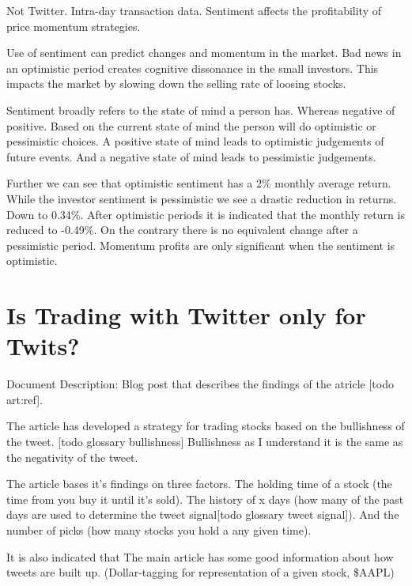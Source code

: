Not Twitter. Intra-day transaction data. 
Sentiment affects the profitability of price momentum strategies.

Use of sentiment can predict changes and momentum in the market.
Bad news in an optimistic period creates cognitive dissonance in the small
investors. This impacts the market by slowing down the selling rate of loosing
stocks. \cite[p29]{doukas10:sentiment_and_momentum} 

Sentiment broadly refers to the state of mind a person has. Whereas negative of
positive. Based on the current state of mind the person will do optimistic or
pessimistic choices. A positive state of mind leads to optimistic judgements of
future events. And a negative state of mind leads to pessimistic judgements. 
\cite[p4]{doukas10:sentiment_and_momentum} 

Further we can see that optimistic sentiment has a 2\% monthly average return. 
While the investor sentiment is pessimistic we see a drastic reduction in
returns. Down to 0.34\%.\cite[p5]{doukas10:sentiment_and_momentum} 
After optimistic periods it is indicated that the monthly return is reduced to
-0.49\%. On the contrary there is no equivalent change after a pessimistic
period. \cite[p6-7]{doukas10:sentiment_and_momentum} 
Momentum profits are only significant when the sentiment is optimistic.
\cite[p29]{doukas10:sentiment_and_momentum}


\section{Is Trading with Twitter only for Twits?}\label{art:ITTT}
Document Description: Blog post that describes the findings of the atricle [todo
art:ref]. 

The article has developed a strategy for trading stocks based on the
bullishness of the tweet. [todo glossary bullishness] Bullishness as I
understand it
is the same as the negativity of the tweet. 

The article bases it's findings on three factors. The holding time of a stock
(the time from you buy it until it's sold). The history of x days (how many of
the past days are used to determine the tweet signal[todo glossary tweet
signal]). And the number of picks (how many stocks you hold a any given
time). 

It is also indicated that The main article has some good information about how
tweets are built up. (Dollar-tagging for representation of a given stock,
\$AAPL)

